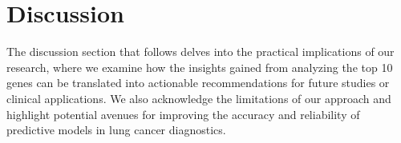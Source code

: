 \section{Discussion} \label{sec:discussion}
The discussion section that follows delves into the practical implications of our research,
where we examine how the insights gained from analyzing the top 10 genes can be translated into actionable recommendations
for future studies or clinical applications.
We also acknowledge the limitations of our approach and
highlight potential avenues for improving the accuracy and reliability of predictive models in lung cancer diagnostics.







